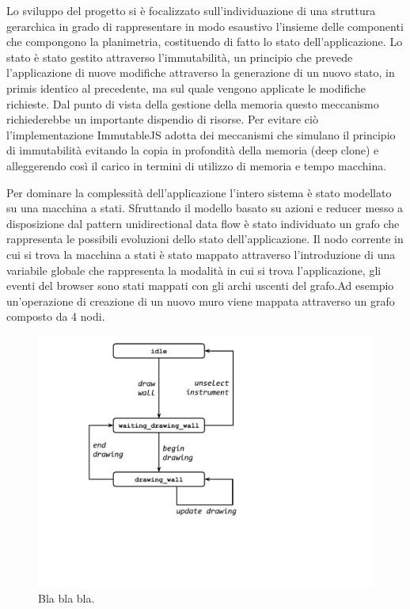 Lo sviluppo del progetto si è focalizzato sull'individuazione di una struttura gerarchica in grado di rappresentare in modo esaustivo l’insieme delle componenti che compongono la planimetria, costituendo di fatto lo stato dell’applicazione. Lo stato è stato gestito attraverso l’immutabilit\`a, un principio che prevede l’applicazione di nuove modifiche attraverso la generazione di un nuovo stato, in primis identico al precedente, ma sul quale vengono applicate le modifiche richieste. Dal punto di vista della gestione della memoria questo meccanismo richiederebbe un importante dispendio di risorse. Per evitare ciò l’implementazione ImmutableJS adotta dei meccanismi che simulano il principio di immutabilit\`a evitando la copia in profondit\`a della memoria  (deep clone) e alleggerendo così il carico in termini di utilizzo di memoria e tempo macchina.


Per dominare la complessit\`a dell’applicazione l’intero sistema è stato modellato su una macchina a stati. Sfruttando il modello basato su azioni e reducer messo a disposizione dal pattern unidirectional data flow è stato individuato un grafo che rappresenta le possibili evoluzioni dello stato dell’applicazione. Il nodo corrente in cui si trova la macchina a stati è stato mappato attraverso l’introduzione di una variabile globale che rappresenta la modalit\`a in cui si trova l’applicazione, gli eventi del browser sono stati mappati con gli archi uscenti del grafo.Ad esempio un’operazione di creazione di un nuovo muro viene mappata attraverso un grafo composto da 4 nodi.

\begin{figure}[!t]
\centering
\includegraphics[width=\linewidth]{contents/images/uc_draw_wall}

\caption{Bla bla bla.}
\label{fig_sim}
\end{figure}